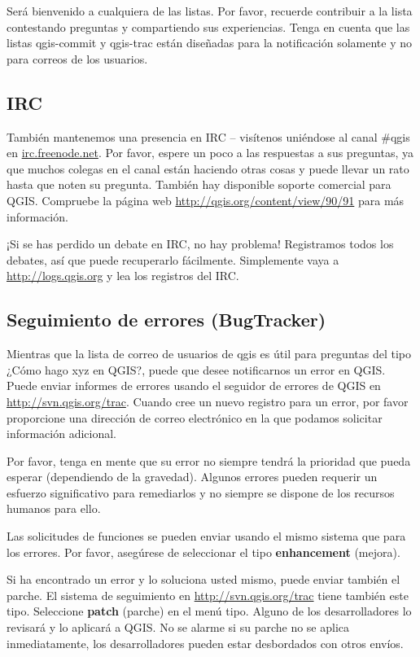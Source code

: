 Será bienvenido a cualquiera de las listas. Por favor, recuerde contribuir a la lista contestando preguntas y compartiendo sus experiencias. Tenga en cuenta que  las listas qgis-commit y qgis-trac están diseñadas para la notificación solamente y no para correos de los usuarios. 

\subsection{IRC}
También mantenemos una presencia en IRC – visítenos uniéndose al canal \#qgis en
\url{irc.freenode.net}. Por favor, espere un poco a las respuestas a sus preguntas, ya que muchos colegas en el canal están haciendo otras cosas y puede llevar un rato hasta que noten su pregunta. También hay disponible soporte comercial para QGIS. Compruebe la página web \url{http://qgis.org/content/view/90/91} para más información.

¡Si se has perdido un debate en IRC, no hay problema! Registramos todos los debates, así que puede recuperarlo fácilmente. Simplemente vaya a \url{http://logs.qgis.org} y lea los registros del IRC.

\subsection{Seguimiento de errores (BugTracker)}
Mientras que la lista de correo de usuarios de qgis es útil para preguntas del tipo ¿Cómo hago xyz en QGIS?, puede que desee notificarnos un error en QGIS. Puede enviar informes de errores usando el seguidor de errores de QGIS en \url{http://svn.qgis.org/trac}. Cuando cree un nuevo registro para un error, por favor proporcione una dirección de correo electrónico en la que podamos solicitar información adicional.

Por favor, tenga en mente que su error no siempre tendrá la prioridad que pueda esperar (dependiendo de la gravedad). Algunos errores pueden requerir un esfuerzo significativo para remediarlos y no siempre se dispone de los recursos humanos para ello.

Las solicitudes de funciones se pueden enviar usando el mismo sistema que para los errores. Por favor, asegúrese de seleccionar el tipo \textbf{enhancement} (mejora).

Si ha encontrado un error y lo soluciona usted mismo, puede enviar también el parche. El sistema de seguimiento en \url{http://svn.qgis.org/trac} tiene también este tipo. Seleccione \textbf{patch} (parche) en el menú tipo. Alguno de los desarrolladores lo revisará y lo aplicará a QGIS. No se alarme si su parche no se aplica inmediatamente, los desarrolladores pueden estar desbordados con otros envíos.

